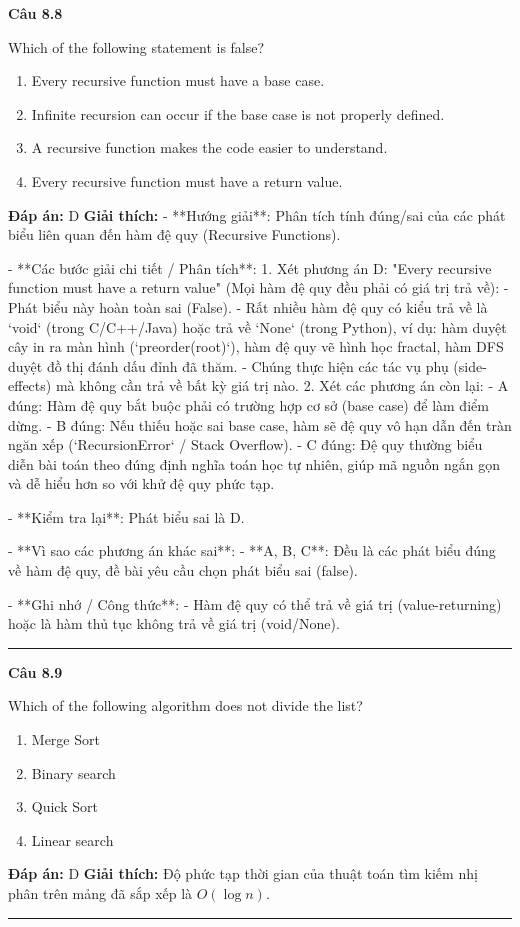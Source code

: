 \documentclass[11pt,a4paper]{article}
\newenvironment{question}[1]{%
  \par\vspace{1em}\noindent\textbf{\large Câu #1}\par\vspace{0.4em}
}{%
  \par\vspace{1em}\hrule\vspace{0.6em}
}
\newenvironment{choices}{%
  \begin{enumerate}[label=\textbf{\Alph*.},leftmargin=2.2em,itemsep=2pt,topsep=3pt]
}{%
  \end{enumerate}
}
\newcommand{\choice}{\item}
\begin{document}
\begin{question}{8.8}
Which of the following statement is false?
\begin{choices}
\choice Every recursive function must have a base case.
\choice Infinite recursion can occur if the base case is not properly defined.
\choice A recursive function makes the code easier to understand.
\choice Every recursive function must have a return value.
\end{choices}
\textbf{Đáp án:} D
\textbf{Giải thích:} - **Hướng giải**:
  Phân tích tính đúng/sai của các phát biểu liên quan đến hàm đệ quy (Recursive Functions).

- **Các bước giải chi tiết / Phân tích**:
  1. Xét phương án D: "Every recursive function must have a return value" (Mọi hàm đệ quy đều phải có giá trị trả về):
     - Phát biểu này hoàn toàn sai (False).
     - Rất nhiều hàm đệ quy có kiểu trả về là `void` (trong C/C++/Java) hoặc trả về `None` (trong Python), ví dụ: hàm duyệt cây in ra màn hình (`preorder(root)`), hàm đệ quy vẽ hình học fractal, hàm DFS duyệt đồ thị đánh dấu đỉnh đã thăm.
     - Chúng thực hiện các tác vụ phụ (side-effects) mà không cần trả về bất kỳ giá trị nào.
  2. Xét các phương án còn lại:
     - A đúng: Hàm đệ quy bắt buộc phải có trường hợp cơ sở (base case) để làm điểm dừng.
     - B đúng: Nếu thiếu hoặc sai base case, hàm sẽ đệ quy vô hạn dẫn đến tràn ngăn xếp (`RecursionError` / Stack Overflow).
     - C đúng: Đệ quy thường biểu diễn bài toán theo đúng định nghĩa toán học tự nhiên, giúp mã nguồn ngắn gọn và dễ hiểu hơn so với khử đệ quy phức tạp.

- **Kiểm tra lại**:
  Phát biểu sai là D.

- **Vì sao các phương án khác sai**:
  - **A, B, C**: Đều là các phát biểu đúng về hàm đệ quy, đề bài yêu cầu chọn phát biểu sai (false).

- **Ghi nhớ / Công thức**:
  - Hàm đệ quy có thể trả về giá trị (value-returning) hoặc là hàm thủ tục không trả về giá trị (void/None).
\end{question}

\begin{question}{8.9}
Which of the following algorithm does not divide the list?
\begin{choices}
\choice Merge Sort
\choice Binary search
\choice Quick Sort
\choice Linear search
\end{choices}
\textbf{Đáp án:} D
\textbf{Giải thích:} Độ phức tạp thời gian của thuật toán tìm kiếm nhị phân trên mảng đã sắp xếp là \(O(\log n)\).
\end{question}
\end{document}
